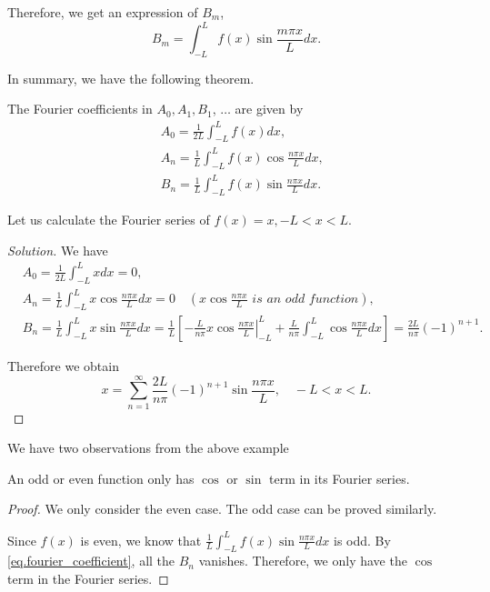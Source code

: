 Therefore, we get an expression of $B_m$,
$$
B_m = \int_{-L}^L f(x) \sin \frac{m \pi x}{L} d x.
$$

In summary, we have the following theorem.

\begin{theorem}[]
The Fourier coefficients in $A_0, A_1, B_1$, $\dots$ are given by
\begin{equation}\label{eq.fourier_coefficient}
    \begin{aligned}
        \,&A_0=\frac{1}{2 L} \int_{-L}^L f(x) d x, 
        \\
        &A_n=\frac{1}{L} \int_{-L}^L f(x) \cos \frac{n \pi x}{L} d x, 
        \\
        &B_n=\frac{1}{L} \int_{-L}^L f(x) \sin \frac{n \pi x}{L} d x.
    \end{aligned}
\end{equation}
\end{theorem}

\begin{example}[]\label{ex.x_fourier}
Let us calculate the Fourier series of $f(x)=x,-L<x<L$. 
\end{example}
\begin{proof}[Solution]
    We have
    $$
    \begin{aligned}
    & A_0=\frac{1}{2 L} \int_{-L}^L x d x=0, 
    \\
    & A_n=\frac{1}{L} \int_{-L}^L x \cos \frac{n \pi x}{L} d x=0 \quad (x \cos \frac{n \pi x}{L} \textit{ is an odd function}), 
    \\
    & B_n=\frac{1}{L} \int_{-L}^L x \sin \frac{n \pi x}{L} d x=\frac{1}{L}\left[-\left.\frac{L}{n \pi} x \cos \frac{n \pi x}{L}\right|_{-L} ^L+\frac{L}{n \pi} \int_{-L}^L \cos \frac{n \pi x}{L} d x\right]=\frac{2 L}{n \pi}(-1)^{n+1} .
    \end{aligned}
    $$
    
    Therefore we obtain
    \begin{equation}\label{eq.fourier_x}
        x=\sum_{n=1}^{\infty} \frac{2 L}{n \pi}(-1)^{n+1} \sin \frac{n \pi x}{L}, \quad-L<x<L .
    \end{equation}
    
\end{proof}

We have two observations from the above example

\begin{proposition}[]\label{prop.odd_even_sin_cos}
    An odd or even function only has $\cos$ or  $\sin$ term in its Fourier series.
\end{proposition}
\begin{proof}
    We only consider the even case. The odd case can be proved similarly. 
    
    Since $f(x)$ is even, we know that $\frac{1}{L} \int_{-L}^L f(x) \sin \frac{n \pi x}{L} d x$ is odd. By \eqref{eq.fourier_coefficient}, all the $B_n$ vanishes. Therefore, we only have the $\cos$ term in the Fourier series.
\end{proof}

